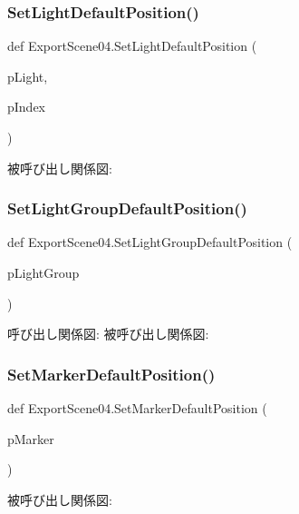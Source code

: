 \subsubsection{\texorpdfstring{Set\+Light\+Default\+Position()}{SetLightDefaultPosition()}}
{\footnotesize\ttfamily def Export\+Scene04.\+Set\+Light\+Default\+Position (\begin{DoxyParamCaption}\item[{}]{p\+Light,  }\item[{}]{p\+Index }\end{DoxyParamCaption})}

被呼び出し関係図\+:
\mbox{\label{namespace_export_scene04_a743605c74923f1ffaf16c6d6eb51eda9}} 
\subsubsection{\texorpdfstring{Set\+Light\+Group\+Default\+Position()}{SetLightGroupDefaultPosition()}}
{\footnotesize\ttfamily def Export\+Scene04.\+Set\+Light\+Group\+Default\+Position (\begin{DoxyParamCaption}\item[{}]{p\+Light\+Group }\end{DoxyParamCaption})}

呼び出し関係図\+:
被呼び出し関係図\+:
\mbox{\label{namespace_export_scene04_a6633021b405d1c03aa792da67e193880}} 
\subsubsection{\texorpdfstring{Set\+Marker\+Default\+Position()}{SetMarkerDefaultPosition()}}
{\footnotesize\ttfamily def Export\+Scene04.\+Set\+Marker\+Default\+Position (\begin{DoxyParamCaption}\item[{}]{p\+Marker }\end{DoxyParamCaption})}

被呼び出し関係図\+:


